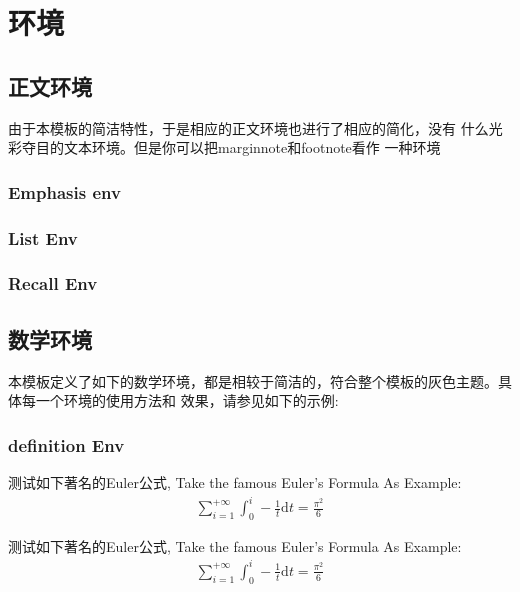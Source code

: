\section{环境}
\subsection{正文环境}
由于本模板的简洁特性，于是相应的正文环境也进行了相应的简化，没有 
什么光彩夺目的文本环境。但是你可以把marginnote和footnote看作
一种环境

\subsubsection{Emphasis env}
\subsubsection{List Env}
\subsubsection{Recall Env}



\subsection{数学环境}
本模板定义了如下的数学环境，都是相较于简洁的，符合整个模板的灰色主题。具体每一个环境的使用方法和
效果，请参见如下的示例:

\subsubsection{definition Env}
\begin{bytes}[10]
\begin{definition}
    测试如下著名的Euler公式, Take the famous Euler's Formula As Example:
    \begin{align}
        \sum_{i=1}^{+\infty}{\int_{0}^{i}-\frac{1}{t}\mathrm{d}t} = \frac{\pi^2}{6}
    \end{align}
\end{definition}
\end{bytes}
\begin{definition}
测试如下著名的Euler公式, Take the famous Euler's Formula As Example:
\begin{align}
    \sum_{i=1}^{+\infty}{\int_{0}^{i}-\frac{1}{t}\mathrm{d}t} = \frac{\pi^2}{6}
\end{align}
\end{definition}


